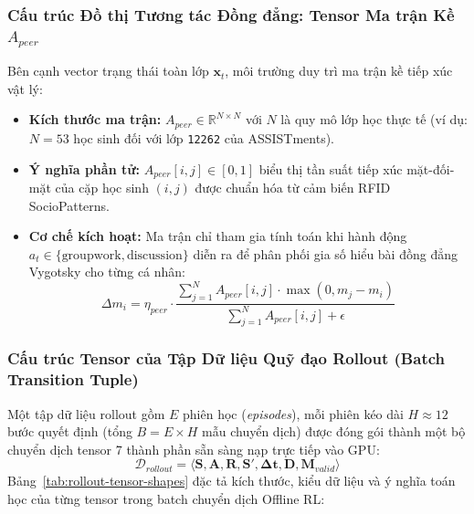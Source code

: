 \subsubsection{Cấu trúc Đồ thị Tương tác Đồng đẳng: Tensor Ma trận Kề $A_{peer}$}
Bên cạnh vector trạng thái toàn lớp $\mathbf{x}_t$, môi trường duy trì ma trận kề tiếp xúc vật lý:
\begin{itemize}
  \item \textbf{Kích thước ma trận:} $A_{peer} \in \mathbb{R}^{N \times N}$ với $N$ là quy mô lớp học thực tế (ví dụ: $N=53$ học sinh đối với lớp \texttt{12262} của ASSISTments).
  \item \textbf{Ý nghĩa phần tử:} $A_{peer}[i, j] \in [0, 1]$ biểu thị tần suất tiếp xúc mặt-đối-mặt của cặp học sinh $(i, j)$ được chuẩn hóa từ cảm biến RFID SocioPatterns.
  \item \textbf{Cơ chế kích hoạt:} Ma trận chỉ tham gia tính toán khi hành động $a_t \in \{\text{groupwork}, \text{discussion}\}$ diễn ra để phân phối gia số hiểu bài đồng đẳng Vygotsky cho từng cá nhân:
  \begin{equation}
    \Delta m_i = \eta_{peer} \cdot \frac{\sum_{j=1}^N A_{peer}[i, j] \cdot \max(0, m_j - m_i)}{\sum_{j=1}^N A_{peer}[i, j] + \epsilon}
  \end{equation}
\end{itemize}

\subsubsection{Cấu trúc Tensor của Tập Dữ liệu Quỹ đạo Rollout (Batch Transition Tuple)}
Một tập dữ liệu rollout gồm $E$ phiên học (\textit{episodes}), mỗi phiên kéo dài $H \approx 12$ bước quyết định (tổng $B = E \times H$ mẫu chuyển dịch) được đóng gói thành một bộ chuyển dịch tensor 7 thành phần sẵn sàng nạp trực tiếp vào GPU:
\begin{equation}
  \mathcal{D}_{rollout} = \langle \mathbf{S}, \mathbf{A}, \mathbf{R}, \mathbf{S}', \bm{\Delta t}, \mathbf{D}, \mathbf{M}_{valid} \rangle
\end{equation}
Bảng~\ref{tab:rollout-tensor-shapes} đặc tả kích thước, kiểu dữ liệu và ý nghĩa toán học của từng tensor trong batch chuyển dịch Offline RL:

